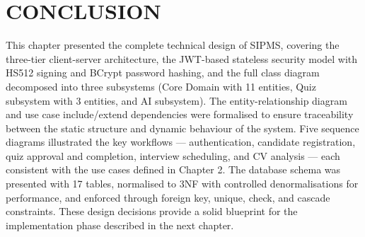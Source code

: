 \section{CONCLUSION}
This chapter presented the complete technical design of SIPMS, covering the three-tier client-server architecture, the JWT-based stateless security model with HS512 signing and BCrypt password hashing, and the full class diagram decomposed into three subsystems (Core Domain with 11 entities, Quiz subsystem with 3 entities, and AI subsystem). The entity-relationship diagram and use case include/extend dependencies were formalised to ensure traceability between the static structure and dynamic behaviour of the system. Five sequence diagrams illustrated the key workflows — authentication, candidate registration, quiz approval and completion, interview scheduling, and CV analysis — each consistent with the use cases defined in Chapter 2. The database schema was presented with 17 tables, normalised to 3NF with controlled denormalisations for performance, and enforced through foreign key, unique, check, and cascade constraints. These design decisions provide a solid blueprint for the implementation phase described in the next chapter.
